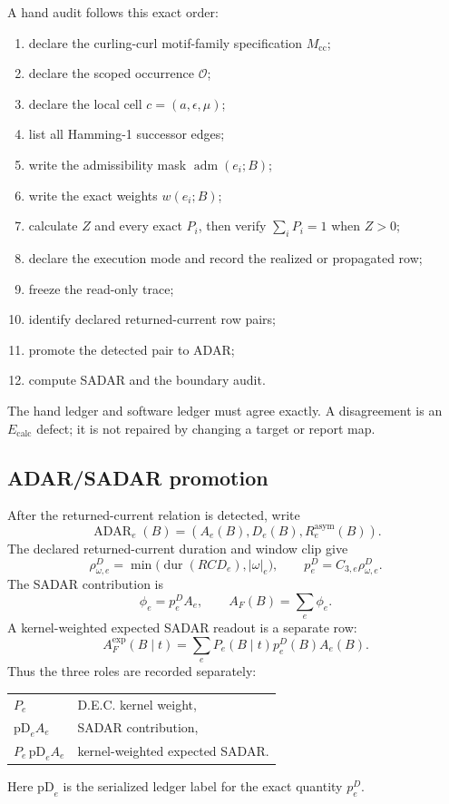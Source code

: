 A hand audit follows this exact order:
\begin{enumerate}[leftmargin=2em]
  \item declare the curling-curl motif-family specification $M_{\mathrm{cc}}$;
  \item declare the scoped occurrence $\mathcal O$;
  \item declare the local cell $c=(a,\epsilon,\mu)$;
  \item list all Hamming-1 successor edges;
  \item write the admissibility mask $\operatorname{adm}(e_i;B)$;
  \item write the exact weights $w(e_i;B)$;
  \item calculate $Z$ and every exact $P_i$, then verify $\sum_iP_i=1$ when $Z>0$;
  \item declare the execution mode and record the realized or propagated row;
  \item freeze the read-only trace;
  \item identify declared returned-current row pairs;
  \item promote the detected pair to ADAR;
  \item compute SADAR and the boundary audit.
\end{enumerate}

The hand ledger and software ledger must agree exactly.  A disagreement is an $E_{\mathrm{calc}}$ defect; it is not repaired by changing a target or report map.

\subsection{ADAR/SADAR promotion}

After the returned-current relation is detected, write
\[
\operatorname{ADAR}_e(B)
=
(A_e(B),D_e(B),R_e^{\mathrm{asym}}(B)).
\]
The declared returned-current duration and window clip give
\[
\rho^D_{\omega,e}
=
\min\bigl(\operatorname{dur}(RCD_e),|\omega|_e\bigr),
\qquad
p^D_e=C_{3,e}\rho^D_{\omega,e}.
\]
The SADAR contribution is
\[
\phi_e=p^D_eA_e,
\qquad
A_F(B)=\sum_e\phi_e.
\]
A kernel-weighted expected SADAR readout is a separate row:
\[
A_F^{\mathrm{exp}}(B\mid t)
=
\sum_e P_e(B\mid t)p^D_e(B)A_e(B).
\]
Thus the three roles are recorded separately:
\begin{center}
\begin{tabular}{@{}ll@{}}
$P_e$ & D.E.C. kernel weight,\\
$\mathrm{pD}_e A_e$ & SADAR contribution,\\
$P_e\,\mathrm{pD}_e A_e$ & kernel-weighted expected SADAR.
\end{tabular}
\end{center}
Here $\mathrm{pD}_e$ is the serialized ledger label for the exact quantity $p_e^D$.


